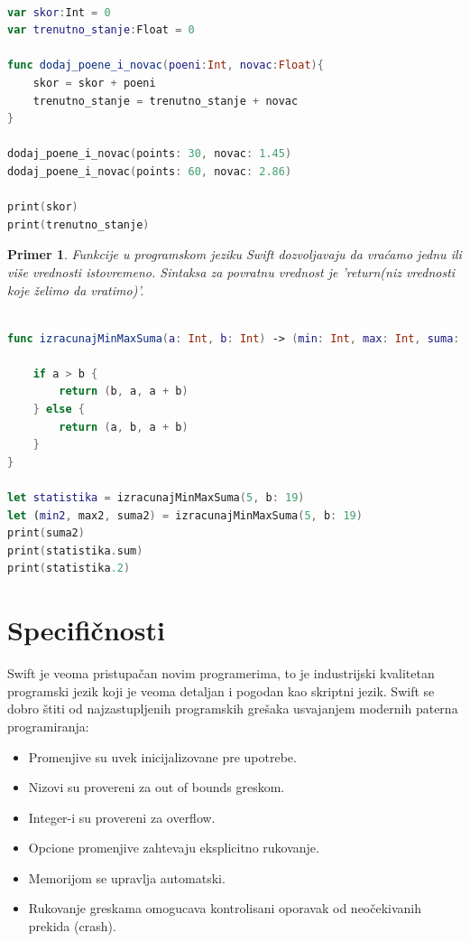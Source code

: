 \documentclass[a4paper]{article}
\newtheorem{primer}{Primer}[section]
\begin{document}
\begin{lstlisting}[language=Swift, caption={Funkcije bez povratne vrednosti},frame=single, label=simple]

var skor:Int = 0
var trenutno_stanje:Float = 0

func dodaj_poene_i_novac(poeni:Int, novac:Float){
	skor = skor + poeni
	trenutno_stanje = trenutno_stanje + novac
}

dodaj_poene_i_novac(points: 30, novac: 1.45)
dodaj_poene_i_novac(points: 60, novac: 2.86)

print(skor)
print(trenutno_stanje)

\end{lstlisting}

\begin{primer}
Funkcije u programskom jeziku Swift dozvoljavaju da vraćamo jednu ili više vrednosti istovremeno. Sintaksa za povratnu vrednost je 'return(niz vrednosti koje želimo da vratimo)'.
\end{primer}

\begin{lstlisting}[language=Swift, caption={Funkcije koje imaju povratnu vrednost},frame=single, label=simple]

func izracunajMinMaxSuma(a: Int, b: Int) -> (min: Int, max: Int, suma: Int) {
    
    if a > b {
        return (b, a, a + b)
    } else {
        return (a, b, a + b)
    }
}
 
let statistika = izracunajMinMaxSuma(5, b: 19)
let (min2, max2, suma2) = izracunajMinMaxSuma(5, b: 19)
print(suma2)            
print(statistika.sum)   
print(statistika.2)     

\end{lstlisting}


\section{Specifičnosti}	
\label{sec:sedmiDeo}

Swift je veoma pristupačan novim programerima, to je industrijski kvalitetan programski jezik koji je veoma detaljan i pogodan kao skriptni jezik. Swift se dobro štiti od najzastupljenih programskih grešaka usvajanjem modernih paterna programiranja:
\begin{itemize}
\item Promenjive su uvek inicijalizovane pre upotrebe.
\item Nizovi su provereni za out of bounds greskom.
\item Integer-i su provereni za overflow.
\item Opcione promenjive zahtevaju eksplicitno rukovanje.
\item Memorijom se upravlja automatski.
\item Rukovanje greskama omogucava kontrolisani oporavak od neočekivanih prekida (crash).
\end{itemize}
\end{document}
